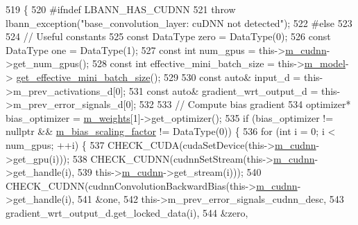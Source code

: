 \begin{DoxyCode}
519                                                                   \{
520 \textcolor{preprocessor}{  #ifndef LBANN\_HAS\_CUDNN}
521     \textcolor{keywordflow}{throw} lbann\_exception(\textcolor{stringliteral}{"base\_convolution\_layer: cuDNN not detected"});
522 \textcolor{preprocessor}{  #else}
523 
524     \textcolor{comment}{// Useful constants}
525     \textcolor{keyword}{const} DataType zero = DataType(0);
526     \textcolor{keyword}{const} DataType one = DataType(1);
527     \textcolor{keyword}{const} \textcolor{keywordtype}{int} num\_gpus = this->\hyperlink{classlbann_1_1Layer_a08dbb94239e3b8c96329786c57c72e21}{m\_cudnn}->get\_num\_gpus();
528     \textcolor{keyword}{const} \textcolor{keywordtype}{int} effective\_mini\_batch\_size = this->\hyperlink{classlbann_1_1Layer_a3d9315e99574166f2f33e37b572021d2}{m\_model}->
      \hyperlink{classlbann_1_1model_a2a9b4cfa1c8c91e4131908751f9c4a6a}{get\_effective\_mini\_batch\_size}();
529 
530     \textcolor{keyword}{const} \textcolor{keyword}{auto}& input\_d = this->m\_prev\_activations\_d[0];
531     \textcolor{keyword}{const} \textcolor{keyword}{auto}& gradient\_wrt\_output\_d = this->m\_prev\_error\_signals\_d[0];
532 
533     \textcolor{comment}{// Compute bias gradient}
534     optimizer* bias\_optimizer = \hyperlink{classlbann_1_1Layer_a7954e30fbf9100a6ba4b56d02767a469}{m\_weights}[1]->get\_optimizer();
535     \textcolor{keywordflow}{if} (bias\_optimizer != \textcolor{keyword}{nullptr} && \hyperlink{classlbann_1_1base__convolution__layer_a5abe0bcd128b66a41fa481b28a9c2104}{m\_bias\_scaling\_factor} != DataType(0)) \{
536       \textcolor{keywordflow}{for} (\textcolor{keywordtype}{int} i = 0; i < num\_gpus; ++i) \{
537         CHECK\_CUDA(cudaSetDevice(this->\hyperlink{classlbann_1_1Layer_a08dbb94239e3b8c96329786c57c72e21}{m\_cudnn}->get\_gpu(i)));
538         CHECK\_CUDNN(cudnnSetStream(this->\hyperlink{classlbann_1_1Layer_a08dbb94239e3b8c96329786c57c72e21}{m\_cudnn}->get\_handle(i),
539                                    this->\hyperlink{classlbann_1_1Layer_a08dbb94239e3b8c96329786c57c72e21}{m\_cudnn}->get\_stream(i)));
540         CHECK\_CUDNN(cudnnConvolutionBackwardBias(this->\hyperlink{classlbann_1_1Layer_a08dbb94239e3b8c96329786c57c72e21}{m\_cudnn}->get\_handle(i),
541                                                  &one,
542                                                  this->m\_prev\_error\_signals\_cudnn\_desc,
543                                                  gradient\_wrt\_output\_d.get\_locked\_data(i),
544                                                  &zero,

\end{DoxyCode}

